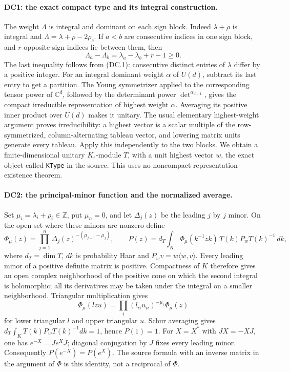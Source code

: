 \paragraph{DC1: the exact compact type and its integral construction.}
\label{claim:DC1}
The weight $\Lambda$ is integral and dominant on each sign block.  Indeed
$\lambda+\rho$ is integral and
$\Lambda=\lambda+\rho-2\rho_c$.  If $a<b$ are consecutive indices in one
sign block, and $r$ opposite-sign indices lie between them, then
\[
 \Lambda_a-\Lambda_b=\lambda_a-\lambda_b+r-1\ge0.
\]
The last inequality follows from (DC.1): consecutive distinct entries of
$\lambda$ differ by a positive integer.  For an integral dominant weight
$\alpha$ of $U(d)$, subtract its last entry to get a partition.  The Young
symmetrizer applied to the corresponding tensor power of $\mathbb C^d$,
followed by the determinant power $\det^{\alpha_{d-1}}$, gives the compact
irreducible representation of highest weight $\alpha$.  Averaging its
positive inner product over $U(d)$ makes it unitary.  The usual elementary
highest-weight argument proves irreducibility: a highest vector is a scalar
multiple of the row-symmetrized, column-alternating tableau vector, and
lowering matrix units generate every tableau.  Apply this independently
to the two blocks.  We obtain a finite-dimensional unitary $K_\epsilon$-module
$T$, with a unit highest vector $w$, the exact object called \texttt{KType}
in the source.  This uses no noncompact representation-existence theorem.

\paragraph{DC2: the principal-minor function and the normalized average.}
\label{claim:DC2}
Set $\mu_i=\lambda_i+\rho_i\in\mathbb Z$, put $\mu_n=0$, and let
$\Delta_j(z)$ be the leading $j$ by $j$ minor.  On the open set where these
minors are nonzero define
\[
 \Phi_\mu(z)=\prod_{j=1}^n\Delta_j(z)^{-(\mu_{j-1}-\mu_j)},
 \qquad
 P(z)=d_T\int_K\Phi_\mu(k^{-1}zk)\,T(k)P_wT(k)^{-1}\,dk,         \tag{DC.3}
\]
where $d_T=\dim T$, $dk$ is probability Haar and $P_w v=w\langle w,v\rangle$.
Every leading minor of a positive definite matrix is positive.  Compactness
of $K$ therefore gives an open complex neighborhood of the positive cone
on which the second integral is holomorphic; all its derivatives may be
taken under the integral on a smaller neighborhood.  Triangular
multiplication gives
\[
 \Phi_\mu(lzu)=\prod_i(l_{ii}u_{ii})^{-\mu_i}\Phi_\mu(z)
                                                                  \tag{DC.4}
\]
for lower triangular $l$ and upper triangular $u$.  Schur averaging gives
$d_T\int_K T(k)P_wT(k)^{-1}dk=1$, hence $P(1)=1$.
For $X=X^*$ with $JX=-XJ$, one has $e^{-X}=Je^XJ$; diagonal conjugation
by $J$ fixes every leading minor.  Consequently $P(e^{-X})=P(e^X)$.
The source formula with an inverse matrix in the argument of $\Phi$ is
this identity, not a reciprocal of $\Phi$.

